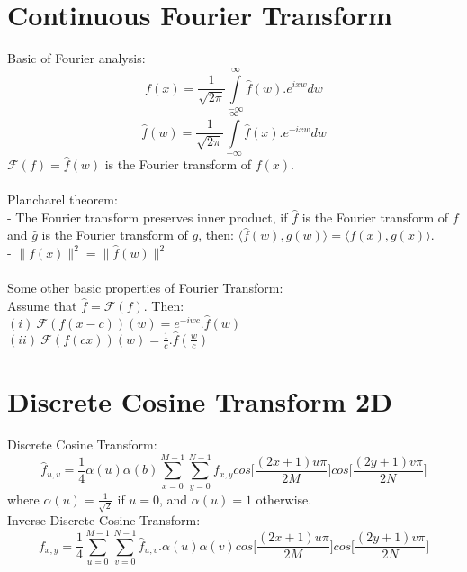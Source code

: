 \documentclass{article}
\begin{document}
\section{Continuous Fourier Transform}
Basic of Fourier analysis:
$$f(x) = \frac{1}{\sqrt{2\pi}} \int\limits_{-\infty}^{\infty} \hat{f}(w).e^{ixw}dw$$
$$\hat{f}(w) = \frac{1}{\sqrt{2\pi}} \int\limits_{-\infty}^{\infty} \hat{f}(x).e^{-ixw}dw$$
$\mathcal{F}(f) = \hat{f}(w)$ is the Fourier transform of $f(x)$. \\ \\
Plancharel theorem: \\
- The Fourier transform preserves inner product, if $\hat{f}$ is the Fourier transform of $f$ and $\hat{g}$ is the Fourier transform of $g$, then: $\langle \hat{f}(w), \hat{g}(w) \rangle = \langle f(x), g(x) \rangle$. \\
- $\|f(x)\|^2 = \|\hat{f}(w)\|^2$ \\ \\
Some other basic properties of Fourier Transform: \\
Assume that $\hat{f} = \mathcal{F}(f)$. Then: \\
$(i) \ \mathcal{F}(f(x - c))(w) = e^{-iwc}.\hat{f}(w)$ \\
$(ii) \ \mathcal{F}(f(cx))(w) = \frac{1}{c}.\hat{f}(\frac{w}{c})$ \\

\section{Discrete Cosine Transform 2D}
Discrete Cosine Transform:
$$\hat{f}_{u, v} = \frac{1}{4} \alpha(u) \alpha(b) \sum\limits_{x = 0}^{M - 1} \sum\limits_{y = 0}^{N - 1} f_{x, y} cos \bigg[ \frac{(2x + 1)u\pi}{2M} \bigg] cos \bigg[ \frac{(2y + 1)v\pi}{2N} \bigg]$$
where $\alpha(u) = \frac{1}{\sqrt{2}}$ if $u = 0$, and $\alpha(u) = 1$ otherwise. \\
Inverse Discrete Cosine Transform:
$$f_{x, y} = \frac{1}{4} \sum\limits_{u = 0}^{M - 1} \sum\limits_{v = 0}^{N - 1} \hat{f}_{u, v}. \alpha(u) \alpha(v) cos \bigg[ \frac{(2x + 1)u\pi}{2M} \bigg] cos \bigg[ \frac{(2y + 1)v\pi}{2N} \bigg]$$
\end{document}
